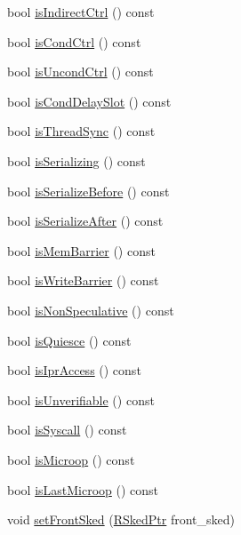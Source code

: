 \begin{DoxyCompactItemize}
\item 
bool \hyperlink{classInOrderDynInst_a5dfa427a48589c4c910416a67808510f}{isIndirectCtrl} () const 
\item 
bool \hyperlink{classInOrderDynInst_a941920262acf4437e241c7600b3007ff}{isCondCtrl} () const 
\item 
bool \hyperlink{classInOrderDynInst_af53002b2f11733681e8552aa6805a706}{isUncondCtrl} () const 
\item 
bool \hyperlink{classInOrderDynInst_a50a12c82ee75e53f92c0852ae3ea71e8}{isCondDelaySlot} () const 
\item 
bool \hyperlink{classInOrderDynInst_ae1376a5b7bbe66f8bcf8b3517802c85f}{isThreadSync} () const 
\item 
bool \hyperlink{classInOrderDynInst_a0b876c794e1ed62f664670215da8793f}{isSerializing} () const 
\item 
bool \hyperlink{classInOrderDynInst_aa350b74ea660b6821bd37cd139bd917b}{isSerializeBefore} () const 
\item 
bool \hyperlink{classInOrderDynInst_a4d1c24871e03e495a1841ea16d11a68f}{isSerializeAfter} () const 
\item 
bool \hyperlink{classInOrderDynInst_a8bcffaf6f3c61001c56f6199a3221221}{isMemBarrier} () const 
\item 
bool \hyperlink{classInOrderDynInst_aadc753a9e3a0d5bb33b6551fb3ad5f7e}{isWriteBarrier} () const 
\item 
bool \hyperlink{classInOrderDynInst_af032774c8da8aea2d9d84d5f3f211a7f}{isNonSpeculative} () const 
\item 
bool \hyperlink{classInOrderDynInst_adc9467e7b34e8dff3964c85b66bb1b93}{isQuiesce} () const 
\item 
bool \hyperlink{classInOrderDynInst_aa201775c9e5befb0bf84cdd7b24519b3}{isIprAccess} () const 
\item 
bool \hyperlink{classInOrderDynInst_ae9cbcc655cf8d63153d0c3f8bbf59841}{isUnverifiable} () const 
\item 
bool \hyperlink{classInOrderDynInst_afa3ec9c6fc7c50b26c6811c3bf1bb5f0}{isSyscall} () const 
\item 
bool \hyperlink{classInOrderDynInst_a19f74cdac8afa870418c056c72645187}{isMicroop} () const 
\item 
bool \hyperlink{classInOrderDynInst_ac600348c1afe65d9299c9635d6ea5773}{isLastMicroop} () const 
\item 
void \hyperlink{classInOrderDynInst_a38747d5669777d42fd95d017abdb0191}{setFrontSked} (\hyperlink{classResourceSked}{RSkedPtr} front\_\-sked)

\end{DoxyCompactItemize}
